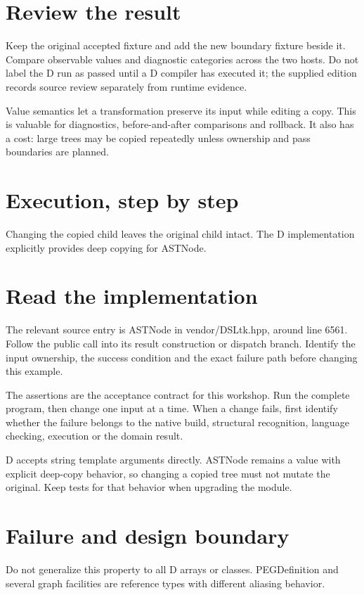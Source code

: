 \section*{Review the result}
Keep the original accepted fixture and add the new boundary fixture beside it. Compare observable values and diagnostic categories across the two hosts. Do not label the D run as passed until a D compiler has executed it; the supplied edition records source review separately from runtime evidence.

\clearpage
{}
Value semantics let a transformation preserve its input while editing a copy. This is valuable for diagnostics, before-and-after comparisons and rollback. It also has a cost: large trees may be copied repeatedly unless ownership and pass boundaries are planned.


\section*{Execution, step by step}
Changing the copied child leaves the original child intact. The D implementation explicitly provides deep copying for ASTNode.

\section*{Read the implementation}
The relevant source entry is ASTNode in vendor/DSLtk.hpp, around line 6561. Follow the public call into its result construction or dispatch branch. Identify the input ownership, the success condition and the exact failure path before changing this example.

The assertions are the acceptance contract for this workshop. Run the complete program, then change one input at a time. When a change fails, first identify whether the failure belongs to the native build, structural recognition, language checking, execution or the domain result.

\clearpage
{}
D accepts string template arguments directly. ASTNode remains a value with explicit deep-copy behavior, so changing a copied tree must not mutate the original. Keep tests for that behavior when upgrading the module.


\section*{Failure and design boundary}
Do not generalize this property to all D arrays or classes. PEGDefinition and several graph facilities are reference types with different aliasing behavior.

